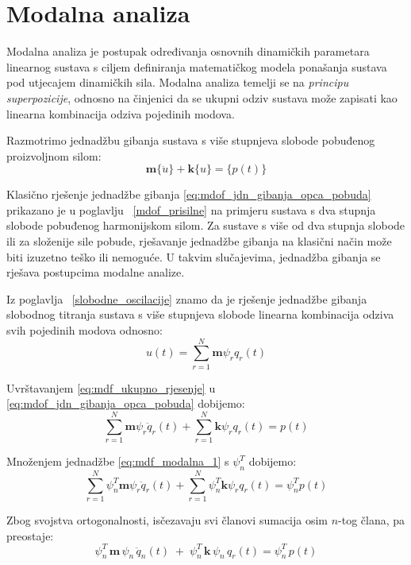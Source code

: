 \documentclass{rgn}
\newcommand\mm{\mathbf{m}}
\newcommand\kk{\mathbf{k}}
\begin{document}
\section{Modalna analiza}
Modalna analiza je postupak određivanja osnovnih dinamičkih parametara linearnog
sustava s ciljem definiranja matematičkog modela ponašanja sustava pod utjecajem
dinamičkih sila. Modalna analiza temelji se na \textit{principu superpozicije},
odnosno na činjenici da se ukupni odziv sustava može zapisati kao linearna
kombinacija odziva pojedinih modova.
\par

Razmotrimo jednadžbu gibanja sustava s više stupnjeva slobode pobuđenog proizvoljnom
silom:
\begin{equation}\label{eq:mdof_jdn_gibanja_opca_pobuda}
    \mm\{\ddot{u}\} + \kk\{u\} = \{p(t)\}
\end{equation}

Klasično rješenje jednadžbe gibanja \eqref{eq:mdof_jdn_gibanja_opca_pobuda}
prikazano je u poglavlju ~\ref{mdof_prisilne} na primjeru sustava s dva stupnja 
slobode pobuđenog harmonijskom silom. Za sustave s više od dva stupnja slobode ili
za složenije sile pobude, rješavanje jednadžbe gibanja na klasični način može biti
izuzetno teško ili nemoguće. U takvim slučajevima, jednadžba gibanja se rješava
postupcima modalne analize.
\par

Iz poglavlja ~\ref{slobodne_oscilacije} znamo da je rješenje jednadžbe gibanja
slobodnog titranja sustava s više stupnjeva slobode linearna kombinacija
odziva svih pojedinih modova odnosno:
\begin{equation}\label{eq:mdf_ukupno_rjesenje}
    u(t)=\sum_{r=1}^N\mm\psi_rq_r(t)
\end{equation}

Uvrštavanjem \eqref{eq:mdf_ukupno_rjesenje} u \eqref{eq:mdof_jdn_gibanja_opca_pobuda} 
dobijemo:
\begin{equation}\label{eq:mdf_modalna_1}
    \sum_{r=1}^N\mm\psi_r\ddot{q}_r(t) + \sum_{r=1}^N\kk\psi_rq_r(t)=p(t)
\end{equation}

Množenjem jednadžbe \eqref{eq:mdf_modalna_1} s $\psi_n^T$ dobijemo:
\begin{equation}\label{eq:mdf_modalna_2}
    \sum_{r=1}^N\psi_n^T\mm\psi_r\ddot{q}_r(t)+\sum_{r=1}^N\psi_n^T\kk\psi_rq_r(t)=\psi_n^Tp(t)
\end{equation}

Zbog svojstva ortogonalnosti, isčezavaju svi članovi sumacija osim $n$-tog člana, pa
preostaje:
\begin{equation}\label{eq:mdf_modalna_jednadzba_nesredjeno}
    \psi_n^T\,\mm\,\psi_n\,\ddot{q}_n(t)\;+\;\psi_n^T\,\kk\,\psi_n\,q_r(t)=\psi_n^T\,p(t)
\end{equation}
\end{document}
